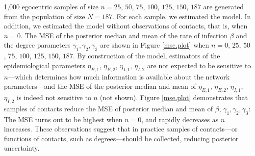 1,000 egocentric samples of size $n = 25$, $50$, $75$, $100$, $125$, $150$, $187$ are generated from the population of size $N = 187$.
For each sample, 
we estimated the model.
In addition,
we estimated the model without observations of contacts,
that is,
when $n=0$.
The MSE of the posterior median and mean of the rate of infection $\beta$ and the degree parameters $\gamma_1, \gamma_2, \gamma_3$ are shown in Figure \ref{mse.plot} when $n = 0$, $25$, $50$, $75$, $100$, $125$, $150$, $187$.
By construction of the model,
estimators of the epidemiological parameters $\eta_{E,1}$, $\eta_{E,2}$, $\eta_{I,1}$, $\eta_{I,2}$ are not expected to be sensitive to $n$---which determines how much information is available about the network parameters---and the MSE of the posterior median and mean of $\eta_{E,1}$, $\eta_{E,2}$, $\eta_{I,1}$, $\eta_{I,2}$ is indeed not sensitive to $n$ (not shown).
Figure \ref{mse.plot} demonstrates that samples of contacts reduce the MSE of posterior median and mean of $\beta$, $\gamma_1, \gamma_2, \gamma_3$:           
The MSE turns out to be highest when $n = 0$,
and rapidly decreases as $n$ increases.
These observations suggest that in practice samples of contacts---or functions of contacts, 
such as degrees---should be collected,
reducing posterior uncertainty.
